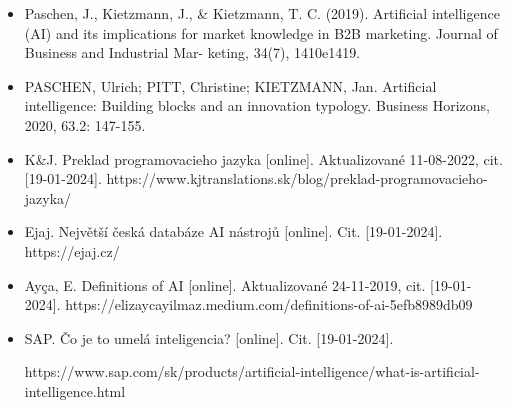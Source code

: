 \begin{itemize}
    \item Paschen, J., Kietzmann, J., \& Kietzmann, T. C. (2019). Artificial intelligence (AI) and its implications for market knowledge in B2B marketing. Journal of Business and Industrial Mar- keting, 34(7), 1410e1419.
    \item PASCHEN, Ulrich; PITT, Christine; KIETZMANN, Jan. Artificial intelligence: Building blocks and an innovation typology. Business Horizons, 2020, 63.2: 147-155.
    \item K\&J. Preklad programovacieho jazyka [online]. Aktualizované  11-08-2022, cit. [19-01-2024]. https://www.kjtranslations.sk/blog/preklad-programovacieho-jazyka/
    \item Ejaj. Největší česká databáze AI nástrojů [online]. Cit. [19-01-2024]. https://ejaj.cz/
    \item Ayça, E. Definitions of AI [online]. Aktualizované  24-11-2019, cit. [19-01-2024]. https://elizaycayilmaz.medium.com/definitions-of-ai-5efb8989db09
    \item SAP. Čo je to umelá inteligencia? [online]. Cit. [19-01-2024]. \par https://www.sap.com/sk/products/artificial-intelligence/what-is-artificial-intelligence.html
\end{itemize}